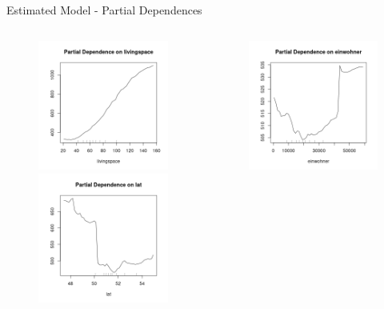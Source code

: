 \documentclass[11pt]{beamer}\usepackage[]{graphicx}\usepackage[]{color}
\begin{document}
\begin{frame}{Estimated Model - Partial Dependences}
\begin{columns}[t]
    \begin{column}{.5\linewidth}
        \begin{figure}\centering
        \includegraphics[width=0.6\linewidth]{Partial_Dependence_livingspace.png}\\
        \includegraphics[width=0.6\linewidth]{Partial_Dependence_lat.png}
        \end{figure}
\end{column}
\begin{column}{.5\linewidth}
       \begin{figure}\centering
        \includegraphics[width=0.6\linewidth]{Partial_Dependence_einwohner.png}\\

\end{figure}
\end{column}
\end{columns}
\end{frame}
\end{document}
